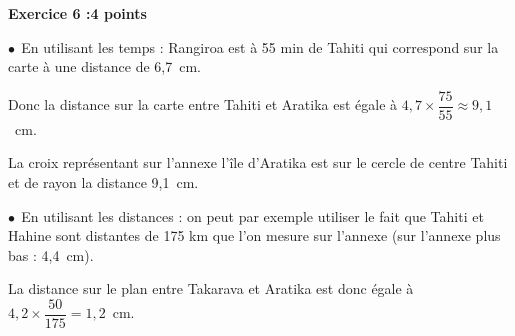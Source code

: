 \textbf{Exercice 6 :\hfill 4 points}

\medskip

% 
%
% 
%
%
%
%  
$\bullet~~$En utilisant les temps : Rangiroa est à 55 min de Tahiti qui correspond sur la carte à une distance de 6,7~cm.

Donc la distance sur la carte entre Tahiti et Aratika est égale à $4,7 \times \dfrac{75}{55} \approx 9,1$~cm.

La croix représentant sur l'annexe l'île d'Aratika est sur le cercle de centre Tahiti et de rayon la distance 9,1~cm.

$\bullet~~$En utilisant les distances : on peut par exemple utiliser le fait que Tahiti et Hahine sont distantes de 175 km que l'on mesure sur l'annexe (sur l'annexe plus bas : 4,4~cm).

La distance sur le plan entre Takarava et Aratika est donc égale à $4,2 \times \dfrac{50}{175} = 1,2$~cm.

